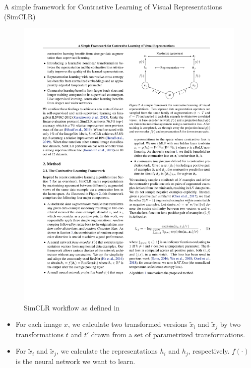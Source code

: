 \documentclass[xcolor=pdftex,dvipsnames,table]{beamer}
\begin{document}
\begin{frame}{A simple framework for Contrastive Learning of Visual Representations (SimCLR) \cite{Chen2020}}
\begin{figure}[htb]
   \centering
   \includegraphics[height=0.4\textheight]{../graphics/sim_clr.pdf}
   \caption{SimCLR workflow as defined in \cite{Chen2020}}
\end{figure}
\begin{itemize}
\item For each image $x$, we calculate two transformed versions $\tilde{x}_i$ and $\tilde{x}_j$ by two transformations $t$ and $t'$ drawn from a set of parametrized transformations. 
\item For $\tilde{x}_i$ and $\tilde{x}_j$, we calculate the representations $h_i$ and $h_j$, respectively. $f(\cdot)$ is the neural network we want to learn. 
\end{itemize}
\end{frame}
\end{document}
